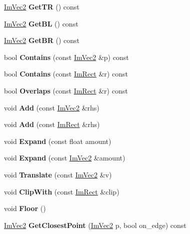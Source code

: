 \begin{DoxyCompactItemize}
\hyperlink{struct_im_vec2}{Im\+Vec2} {\bfseries Get\+TR} () const
\item 
\mbox{\label{struct_im_rect_a59d9751bc7be6745dddf5b83b9155669}} 
\hyperlink{struct_im_vec2}{Im\+Vec2} {\bfseries Get\+BL} () const
\item 
\mbox{\label{struct_im_rect_ad2f2687254beed5a9b19bde0d6fa14f5}} 
\hyperlink{struct_im_vec2}{Im\+Vec2} {\bfseries Get\+BR} () const
\item 
\mbox{\label{struct_im_rect_ac583156fd0e9306181fff5d120b262ea}} 
bool {\bfseries Contains} (const \hyperlink{struct_im_vec2}{Im\+Vec2} \&p) const
\item 
\mbox{\label{struct_im_rect_ad6043344d8ac30d5f342c71641cfe24b}} 
bool {\bfseries Contains} (const \hyperlink{struct_im_rect}{Im\+Rect} \&r) const
\item 
\mbox{\label{struct_im_rect_a0af3bade3781e5e7c6afdf71ccfb0d43}} 
bool {\bfseries Overlaps} (const \hyperlink{struct_im_rect}{Im\+Rect} \&r) const
\item 
\mbox{\label{struct_im_rect_a9d6cbef8c86ca01a16bb0fd35b457f88}} 
void {\bfseries Add} (const \hyperlink{struct_im_vec2}{Im\+Vec2} \&rhs)
\item 
\mbox{\label{struct_im_rect_a9bcb65fd17843c74555291a522e9ebdf}} 
void {\bfseries Add} (const \hyperlink{struct_im_rect}{Im\+Rect} \&rhs)
\item 
\mbox{\label{struct_im_rect_af33a7424c3341d08acd69da30c27c753}} 
void {\bfseries Expand} (const float amount)
\item 
\mbox{\label{struct_im_rect_ac0b0b88fe65725b4694cd7d91d42d382}} 
void {\bfseries Expand} (const \hyperlink{struct_im_vec2}{Im\+Vec2} \&amount)
\item 
\mbox{\label{struct_im_rect_ae964217d0317002b1ae80f935c97e689}} 
void {\bfseries Translate} (const \hyperlink{struct_im_vec2}{Im\+Vec2} \&v)
\item 
\mbox{\label{struct_im_rect_a5e220ababe2fa079638aab8f4b0b8ace}} 
void {\bfseries Clip\+With} (const \hyperlink{struct_im_rect}{Im\+Rect} \&clip)
\item 
\mbox{\label{struct_im_rect_a8fdf75a0c64ff29f65113cd9f8be77ab}} 
void {\bfseries Floor} ()
\item 
\mbox{\label{struct_im_rect_a223c67d4c93e5c87a33a68ebb527bbb8}} 
\hyperlink{struct_im_vec2}{Im\+Vec2} {\bfseries Get\+Closest\+Point} (\hyperlink{struct_im_vec2}{Im\+Vec2} p, bool on\+\_\+edge) const
\end{DoxyCompactItemize}
